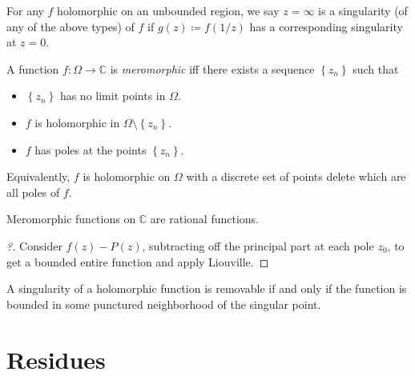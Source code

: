 \begin{definition}

For any \(f\) holomorphic on an unbounded region, we say \(z=\infty\) is
a singularity (of any of the above types) of \(f\) if
\(g(z) \coloneqq f(1/z)\) has a corresponding singularity at \(z=0\).

\end{definition}

\begin{definition}[Meromorphic]

A function \(f:\Omega\to{\mathbb{C}}\) is \emph{meromorphic} iff there
exists a sequence \(\left\{{z_n}\right\}\) such that

\begin{itemize}
\tightlist
\item
  \(\left\{{z_n}\right\}\) has no limit points in \(\Omega\).
\item
  \(f\) is holomorphic in \(\Omega\setminus\left\{{z_n}\right\}\).
\item
  \(f\) has poles at the points \(\left\{{z_n}\right\}\).
\end{itemize}

Equivalently, \(f\) is holomorphic on \(\Omega\) with a discrete set of
points delete which are all poles of \(f\).

\end{definition}

\begin{theorem}

Meromorphic functions on \({\mathbb{C}}\) are rational functions.

\end{theorem}

\begin{proof}[?]

Consider \(f(z) - P(z)\), subtracting off the principal part at each
pole \(z_0\), to get a bounded entire function and apply Liouville.

\end{proof}

\begin{theorem}

A singularity of a holomorphic function is removable if and only if the
function is bounded in some punctured neighborhood of the singular
point.

\end{theorem}

\hypertarget{residues}{%
\section{Residues}\label{residues}}

